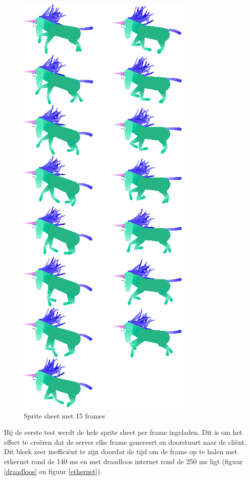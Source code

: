 \begin{figure} [H]
	\centering
	\includegraphics [scale=0.7] {img/charging.png}
	\caption{Sprite sheet met 15 frames} \label{sheet}
\end{figure}

Bij de eerste test werdt de hele sprite sheet per frame ingeladen. Dit is om het effect te creëren dat de server elke frame genereert en doorstuurt naar de cliënt. Dit bleek zeer inefficiënt te zijn doordat de tijd om de frame op te halen met ethernet rond de 140 ms en met draadloos internet rond de 250 ms ligt (figuur \ref{draadloos} en figuur \ref{ethernet}).

